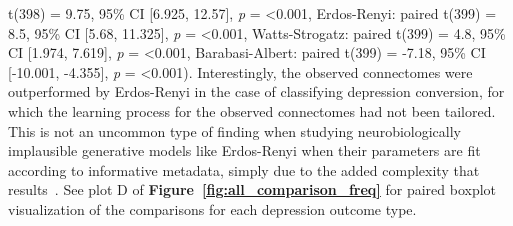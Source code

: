 \documentclass[
  notitlepage]{article}
\begin{document}
t(398) = 9.75, 95\% CI {[}6.925, 12.57{]}, \emph{p} = \textless0.001,
Erdos-Renyi: paired t(399) = 8.5, 95\% CI {[}5.68, 11.325{]}, \emph{p} =
\textless0.001, Watts-Strogatz: paired t(399) = 4.8, 95\% CI {[}1.974,
7.619{]}, \emph{p} = \textless0.001, Barabasi-Albert: paired t(399) =
-7.18, 95\% CI {[}-10.001, -4.355{]}, \emph{p} = \textless0.001).
Interestingly, the observed connectomes were outperformed by Erdos-Renyi
in the case of classifying depression conversion, for which the learning
process for the observed connectomes had not been tailored. This is not
an uncommon type of finding when studying neurobiologically implausible
generative models like Erdos-Renyi when their parameters are fit
according to informative metadata, simply due to the added complexity
that results~\cite{Betzel2017}. See plot D of \textbf{Figure~\ref{fig:all_comparison_freq}} for paired boxplot visualization of the
comparisons for each depression outcome type.
\end{document}
